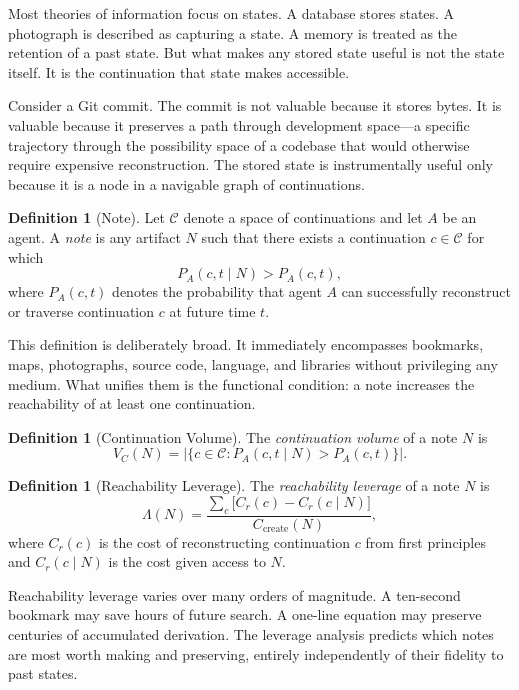 \documentclass[12pt, a4paper, openany]{book}
\theoremstyle{plain}
\theoremstyle{definition}
\newtheorem{definition}[theorem]{Definition}
\theoremstyle{remark}
\newcommand{\calC}{\mathcal{C}}
\begin{document}
Most theories of information focus on states. A database stores states. A
photograph is described as capturing a state. A memory is treated as the retention
of a past state. But what makes any stored state useful is not the state itself.
It is the continuation that state makes accessible.

Consider a Git commit. The commit is not valuable because it stores bytes. It is
valuable because it preserves a path through development space---a specific
trajectory through the possibility space of a codebase that would otherwise require
expensive reconstruction. The stored state is instrumentally useful only because
it is a node in a navigable graph of continuations.

\begin{definition}[Note]
Let $\calC$ denote a space of continuations and let $A$ be an agent. A
\emph{note} is any artifact $N$ such that there exists a continuation
$c \in \calC$ for which
\[
P_A(c, t \mid N) > P_A(c, t),
\]
where $P_A(c, t)$ denotes the probability that agent $A$ can successfully
reconstruct or traverse continuation $c$ at future time $t$.
\end{definition}

This definition is deliberately broad. It immediately encompasses bookmarks, maps,
photographs, source code, language, and libraries without privileging any medium.
What unifies them is the functional condition: a note increases the reachability
of at least one continuation.

\begin{definition}[Continuation Volume]
The \emph{continuation volume} of a note $N$ is
\[
V_C(N) = \bigl|\{c \in \calC : P_A(c, t \mid N) > P_A(c, t)\}\bigr|.
\]
\end{definition}

\begin{definition}[Reachability Leverage]
The \emph{reachability leverage} of a note $N$ is
\[
\Lambda(N) = \frac{\sum_{c} \bigl[C_r(c) - C_r(c \mid N)\bigr]}{C_{\text{create}}(N)},
\]
where $C_r(c)$ is the cost of reconstructing continuation $c$ from first principles
and $C_r(c \mid N)$ is the cost given access to $N$.
\end{definition}

Reachability leverage varies over many orders of magnitude. A ten-second bookmark
may save hours of future search. A one-line equation may preserve centuries of
accumulated derivation. The leverage analysis predicts which notes are most worth
making and preserving, entirely independently of their fidelity to past states.
\end{document}
